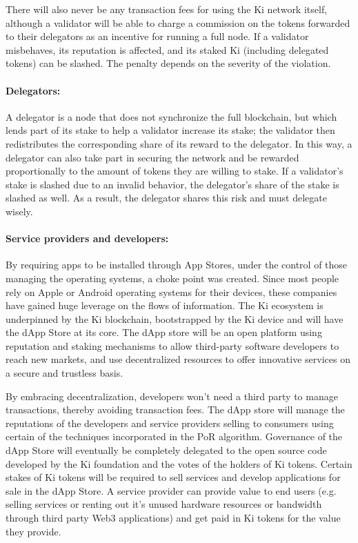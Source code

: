 There will also never be any transaction fees for using the Ki network itself, although a validator will be able to charge a commission on the tokens forwarded to their delegators as an incentive for running a full node. If a validator misbehaves, its reputation is affected, and its staked Ki (including delegated tokens) can be slashed. The penalty depends on the severity of the violation.
					
\paragraph{Delegators:} A delegator is a node that does not synchronize the full blockchain, but which lends part of its stake to help a validator increase its stake; the validator then redistributes the corresponding share of its reward to the delegator. In this way, a delegator can also take part in securing the network and be rewarded proportionally to the amount of tokens they are willing to stake. If a validator's stake is slashed due to an invalid behavior, the delegator's share of the stake is slashed as well. As a result, the delegator shares this risk and must delegate wisely.
					
\paragraph{Service providers and developers:} By requiring apps to be installed through App Stores, under the control of those managing the operating systems, a choke point was created. Since most people rely on Apple or Android operating systems for their devices, these companies have gained huge leverage on the flows of information. The Ki ecosystem is underpinned by the Ki blockchain, bootstrapped by the Ki device and will have the dApp Store at its core. The dApp store will be an open platform using reputation and staking mechanisms to allow third-party software developers to reach new markets, and use decentralized resources to offer innovative services on a secure and trustless basis. 


By embracing decentralization, developers won't need a third party to manage transactions, thereby avoiding transaction fees. The dApp store will manage the reputations of the developers and service providers selling to consumers using certain of the techniques incorporated in the PoR algorithm. Governance of the dApp Store will eventually be completely delegated to the open source code developed by the Ki foundation and the votes of the holders of Ki tokens. Certain stakes of Ki tokens will be required to sell services and develop applications for sale in the dApp Store. A service provider can provide value to end users (e.g. selling services or renting out it's unused hardware resources or bandwidth through third party Web3 applications) and get paid in Ki tokens for the value they provide. 

